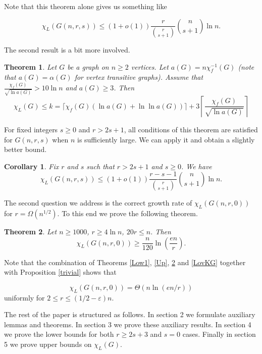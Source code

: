 \documentclass[10pt,a4paper]{article}
\newtheorem{theorem}{Theorem}
\newtheorem{corollary}{Corollary}[section]
\theoremstyle{remark}
\theoremstyle{definition}
\newcommand{\skob}[1]{\left(#1\right)}
\begin{document}
Note that this theorem alone gives us something like 

$$
    \chi_L(G(n,r,s)) \leq (1+o(1))\frac{r}{\binom{r}{s+1}}\binom{n}{s+1}\ln n.
$$

The second result is a bit more involved.


\begin{theorem}
    \label{UB2}
    Let $G$ be a graph on $n \geq 2$ vertices. Let $a(G) = n\chi^{-1}_f(G)$ (note that $a(G) = \alpha(G)$ for vertex transitive graphs). Assume that $\frac{\chi_f(G)}{\sqrt{\ln a(G)}} > 10\ln n$ and $a(G) \geq 3$. Then
    $$
        \chi_L(G) \leq k = \lceil\chi_f(G)\skob{\ln a(G) + \ln \ln a(G)}\rceil + 3\left\lceil\frac{\chi_f(G)}{\sqrt{\ln a(G)}}\right\rceil
    $$
\end{theorem}


For fixed integers $s \geq 0$ and $r > 2s+1$, all conditions of this theorem are satisfied for $G(n,r,s)$ when $n$ is sufficiently large. We can apply it and obtain a slightly better bound.

\begin{corollary}    
    Fix $r$ and $s$ such that $r > 2s+1$ and $s \geq 0$. We have 
    $$
        \chi_L(G(n,r,s)) \leq (1+o(1))\frac{r-s-1}{\binom{r}{s+1}}\binom{n}{s+1}\ln n.
    $$
\end{corollary}


The second question we address is the correct growth rate of $\chi_L(G(n,r,0))$ for $r = \Omega(n^{1/2})$. To this end we prove the following theorem.

\begin{theorem}
    \label{main_kgnr}
	Let $n \geq 1000$, $r \geq 4\ln n$, $20r \leq n$. Then
	$$
		\chi_L(G(n,r,0)) \geq \frac{n}{120}\ln\skob{\frac{en}{r}}.
	$$
\end{theorem}

Note that the combination of Theorems \ref{Low1}, \ref{Up}, \ref{main_kgnr} and \ref{LovKG} together with Proposition \ref{trivial} shows that 

$$ 
    \chi_L(G(n,r,0)) = \Theta\skob{n\ln\skob{en/r}}
$$
uniformly for $2 \leq r \leq (1/2 - \varepsilon)n$.

The rest of the paper is structured as follows. In section 2 we formulate auxiliary lemmas and theorems. In section 3 we prove these auxiliary results. In section 4 we prove the lower bounds for both $r \geq 2s+3$ and $s = 0$ cases. Finally in section 5 we prove upper bounds on $\chi_L(G)$.


\end{document}
